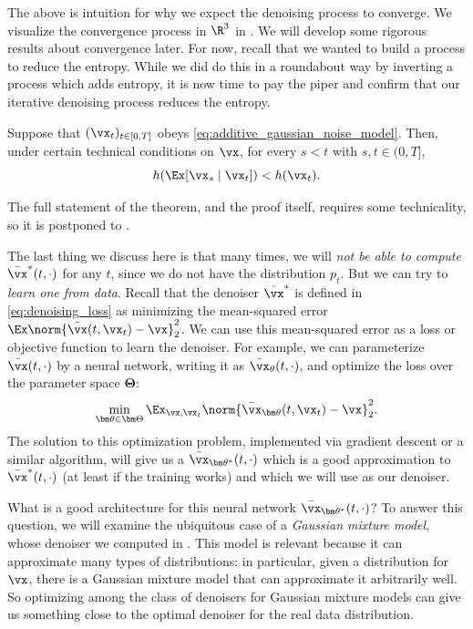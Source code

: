 \documentclass[../../book-main.tex]{subfiles}
\begin{document}
The above is intuition for why we expect the denoising process to converge. We visualize the convergence process in \(\R^{3}\) in . We will develop some rigorous results about convergence later. For now, recall that we wanted to build a process to reduce the entropy. While we did do this in a roundabout way by inverting a process which adds entropy, it is now time to pay the piper and confirm that our iterative denoising process reduces the entropy.

\begin{theorem}
	Suppose that \((\vx_{t})_{t \in [0, T]}\) obeys \eqref{eq:additive_gaussian_noise_model}. Then, under certain technical conditions on \(\vx\), for every \(s < t\) with \(s, t \in (0, T]\),
	\begin{equation}
		h(\Ex[\vx_{s} \mid \vx_{t}]) < h(\vx_{t}).
	\end{equation}
\end{theorem}
The full statement of the theorem, and the proof itself, requires some technicality, so it is postponed to .

The last thing we discuss here is that many times, we will \textit{not be able to compute} \(\bar{\vx}^{\ast}(t, \cdot)\) for any \(t\), since we do not have the distribution \(p_{t}\). But we can try to \textit{learn one from data}. Recall that the denoiser \(\bar{\vx}^{\ast}\) is defined in \eqref{eq:denoising_loss} as minimizing the mean-squared error \(\Ex\norm{\bar{\vx}(t, \vx_{t}) - \vx}_{2}^{2}\). We can use this mean-squared error as a loss or objective function to learn the denoiser. For example, we can parameterize \(\bar{\vx}(t, \cdot)\) by a neural network, writing it as \(\bar{\vx}_{\theta}(t, \cdot)\), and optimize the loss over the parameter space \(\bm\Theta\):
\begin{equation}
	\min_{\bm \theta \in \bm \Theta}\Ex_{\vx, \vx_{t}}\norm{\bar{\vx}_{\bm\theta}(t, \vx_{t}) - \vx}_{2}^{2}.
\end{equation}
The solution to this optimization problem, implemented via gradient descent or a similar algorithm, will give us a \(\bar{\vx}_{\bm\theta^{\ast}}(t, \cdot)\) which is a good approximation to \(\bar{\vx}^{\ast}(t, \cdot)\) (at least if the training works) and which we will use as our denoiser.

What is a good architecture for this neural network \(\bar{\vx}_{\bm\theta^{\ast}}(t, \cdot)\)? To answer this question, we will examine the ubiquitous case of a \textit{Gaussian mixture model},  whose denoiser we computed in . This model is relevant because it can approximate many types of distributions: in particular, given a distribution for \(\vx\), there is a Gaussian mixture model that can approximate it arbitrarily well. So optimizing among the class of denoisers for Gaussian mixture models can give us something close to the optimal denoiser for the real data distribution. 
\end{document}
